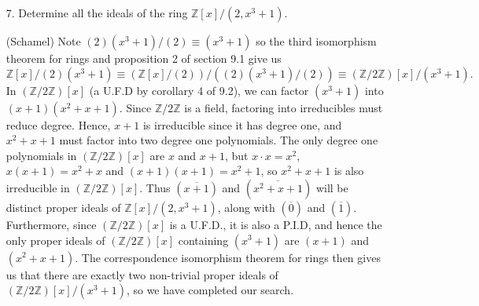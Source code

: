 \documentclass[10pt]{article}
\newcommand{\Z}{\mathbb{Z}}
\begin{document}
\begin{itemize}
\begin{itemize}
\end{itemize}

\item[7.]  Determine all the ideals of the ring $\Z[x]/(2,x^3+1)$.

(Schamel) Note $(2)(x^3+1)/(2) \equiv (x^3+1)$ so the third
isomorphism theorem for rings and proposition 2 of section 9.1 give
us
\[\Z[x]/(2)(x^3+1) \equiv (\Z[x]/(2))/((2)(x^3+1)/(2)) \equiv (\Z/2\Z)[x]/(x^3+1).\]
In $(\Z/2\Z)[x]$ (a U.F.D by corollary 4 of 9.2), we can factor
$(x^3+1)$ into $(x+1)(x^2+x+1)$.  Since $\Z/2\Z$ is a field,
factoring into irreducibles must reduce degree. Hence, $x+1$ is
irreducible since it has degree one, and $x^2+x+1$ must factor into
two degree one polynomials.  The only degree one polynomials in
$(\Z/2\Z)[x]$ are $x$ and $x+1$, but $x\cdot x = x^2$,
$x(x+1)=x^2+x$ and $(x+1)(x+1)= x^2 + 1$, so $x^2+x+1$ is also
irreducible in $(\Z/2\Z)[x]$.  Thus $(\overline{x+1})$ and
$(\overline{x^2+x+1})$ will be distinct proper ideals of
$\Z[x]/(2,x^3+1)$, along with $(\overline{0})$ and $(\overline{1})$.
Furthermore, since $(\Z/2\Z)[x]$ is a U.F.D., it is also a P.I.D,
and hence the only proper ideals of $(\Z/2\Z)[x]$ containing
$(x^3+1)$ are $(x+1)$ and $(x^2+x+1)$.  The correspondence
isomorphism theorem for rings then gives us that there are exactly
two non-trivial proper ideals of $(\Z/2\Z)[x]/(x^3+1)$, so we have
completed our search.
\end{itemize}
\end{document}
